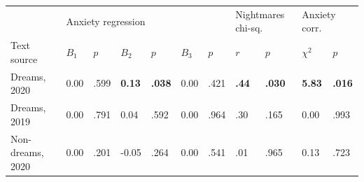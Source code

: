 \begin{tabular}{p{} p{} p{} p{} p{} p{} p{} p{} p{} p{} p{}}
    \toprule
    {} & \multicolumn{6}{l}{Anxiety regression} & \multicolumn{2}{l}{Nightmares chi-sq.} & \multicolumn{2}{l}{Anxiety corr.} \\
    Text source & $B_1$ & $p$ & $B_2$ & $p$ & $B_3$ & $p$ & $r$ & $p$ & $\chi^2$ & $p$ \\
    \midrule
    Dreams, 2020 & 0.00 & .599 & \textbf{0.13} & \textbf{.038} & 0.00 & .421 & \textbf{.44} & \textbf{.030} & \textbf{5.83} & \textbf{.016} \\
    Dreams, 2019 & 0.00 & .791 & 0.04 & .592 & 0.00 & .964 & .30 & .165 & 0.00 & .993 \\
    Non-dreams, 2020 & 0.00 & .201 & -0.05 & .264 & 0.00 & .541 & .01 & .965 & 0.13 & .723 \\
    \bottomrule
\end{tabular}